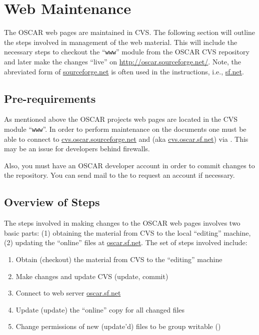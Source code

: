 %
%
%

\section{Web Maintenance}
\label{sec:www}

The OSCAR web pages are maintained in CVS.  The following section will
outline the steps involved in management of the web material.  This will
include the necessary steps to checkout the ``{\tt www}'' module from the
OSCAR CVS repository and later make the changes ``live'' on 
\url{http://oscar.sourceforge.net/}.   Note, the abreviated form of
\url{sourceforge.net} is often used in the instructions, i.e., \url{sf.net}.


\subsection{Pre-requirements}

As mentioned above the OSCAR projects web pages are located in the CVS
module ``{\tt www}''.  In order to perform maintenance on the documents one
must be able to connect to \url{cvs.oscar.sourceforge.net} and (aka
\url{cvs.oscar.sf.net}) via .  This may be an issue for developers
behind firewalls. 

Also, you must have an OSCAR developer account in order to commit changes
to the repository.  You can send mail to the
 to request an account if
necessary.




\subsection{Overview of Steps}

The steps involved in making changes to the OSCAR web pages involves
two basic parts: (1) obtaining the material from CVS to the local
``editing'' machine, (2) updating the ``online'' files at
\url{oscar.sf.net}.  The set of steps involved include:

\begin{enumerate}
	\item Obtain (checkout) the material from CVS to the ``editing'' machine
	\item Make changes and update CVS (update, commit)
	\item Connect to web server \url{oscar.sf.net}
	\item Update (update) the ``online'' copy for all changed files
	\item Change permissions of new (update'd) files to be group writable
	()
\end{enumerate}



